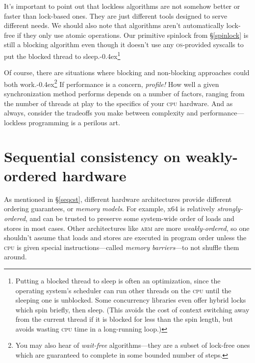 \documentclass[fontsize=10pt, numbers=endperiod]{scrartcl}
\newcommand{\punckern}{\kern-0.4ex}
\newcommand{\introduce}[1]{\textit{#1}}
\newcommand{\secref}[1]{\hyperref[#1]{\textsc{\S}\ref*{#1}}}
\begin{document}
\begin{multicols}{2}
It's important to point out that lockless algorithms are not somehow better
or faster than lock-based ones.
They are just different tools designed to serve different needs.
We should also note that algorithms aren't automatically lock-free if
they only use atomic operations.
Our primitive spinlock from \secref{spinlock} is still a blocking
algorithm even though it doesn't use any \textsc{os}-provided syscalls to
put the blocked thread to sleep.\punckern\footnote{Putting a blocked thread
to sleep is often an optimization,
since the operating system's scheduler can run other threads on the \textsc{cpu}
until the sleeping one is unblocked.
Some concurrency libraries even offer hybrid locks which spin briefly,
then sleep.
(This avoids the cost of context switching away from the current thread if it
is blocked for less than the spin length, but avoids wasting \textsc{cpu}
time in a long-running loop.)}

Of course, there are situations where blocking
and non-blocking approaches could both work.\punckern\footnote{You
may also hear of \introduce{wait-free} algorithms---they are a subset of
lock-free ones which are guaranteed to complete in some
bounded number of steps.}
If performance is a concern, \emph{profile!}
How well a given synchronization method performs depends on a number of factors,
ranging from the number of threads at
play to the specifics of your \textsc{cpu} hardware.
And as always, consider the tradeoffs you make between
complexity and performance---lockless programming is a perilous art.

\section{Sequential consistency on weakly-ordered hardware}

As mentioned in \secref{seqcst}, different hardware architectures
provide different ordering guarantees, or \introduce{memory models}.
For example, x64 is relatively \introduce{strongly-ordered},
and can be trusted to preserve some system-wide order of
loads and stores in most cases.
Other architectures like \textsc{arm} are more \introduce{weakly-ordered},
so one shouldn't assume that loads and stores are executed in
program order unless the \textsc{cpu} is given special instructions---called
\introduce{memory barriers}---to not shuffle them around.


\end{multicols}
\end{document}
